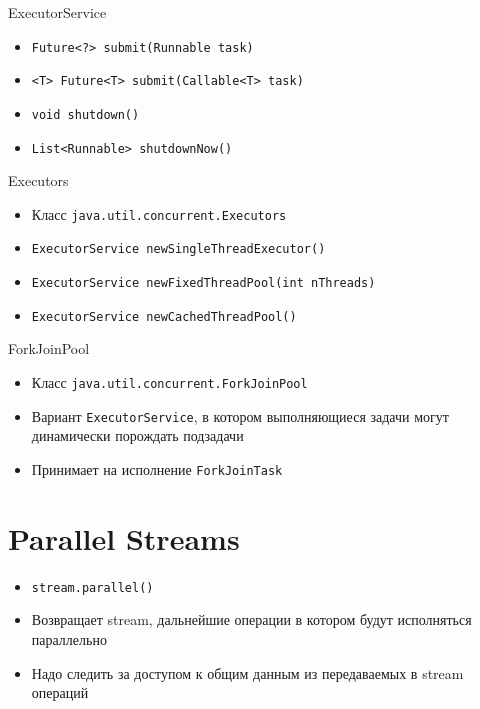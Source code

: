 \documentclass[unicode]{beamer}
\begin{document}
\begin{frame}{ExecutorService}
\begin{itemize}
\item \lstinline|Future<?> submit(Runnable task)|
    \bigskip

\item \lstinline|<T> Future<T> submit(Callable<T> task)|
    \bigskip

\item \lstinline|void shutdown()|
    \bigskip

\item \lstinline|List<Runnable> shutdownNow()|
\end{itemize}
\end{frame}


\begin{frame}{Executors}
\begin{itemize}
\item Класс \texttt{java.util.concurrent.Executors}
    \bigskip

\item \lstinline|ExecutorService newSingleThreadExecutor()|
    \bigskip

\item \lstinline|ExecutorService newFixedThreadPool(int nThreads)|
    \bigskip

\item \lstinline|ExecutorService newCachedThreadPool()|
\end{itemize}
\end{frame}


\begin{frame}{ForkJoinPool}
\begin{itemize}
\item Класс \texttt{java.util.concurrent.ForkJoinPool}
    \bigskip

\item Вариант \texttt{ExecutorService}, в котором выполняющиеся
    задачи могут динамически порождать подзадачи
    \bigskip

\item Принимает на исполнение \texttt{ForkJoinTask}
\end{itemize}
\end{frame}


\section{Parallel Streams}

\begin{frame}
\begin{itemize}
\item \lstinline|stream.parallel()|
    \bigskip

\item Возвращает stream, дальнейшие операции в котором
    будут исполняться параллельно
    \bigskip

\item Надо следить за доступом к общим данным из
    передаваемых в stream операций
\end{itemize}
\end{frame}
\end{document}
